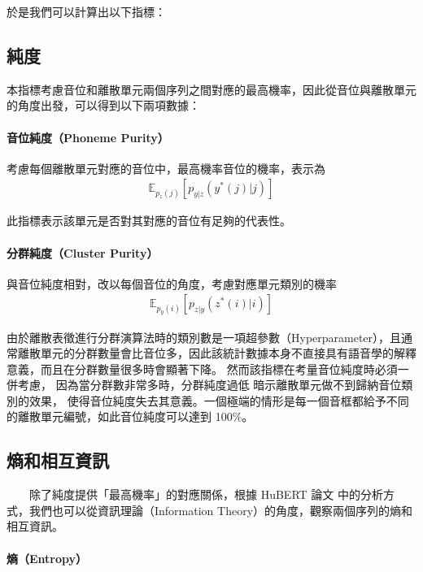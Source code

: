 於是我們可以計算出以下指標：

\subsection{純度}

        本指標考慮音位和離散單元兩個序列之間對應的最高機率，因此從音位與離散單元的角度出發，可以得到以下兩項數據：

\paragraph{音位純度（Phoneme Purity）}

        考慮每個離散單元對應的音位中，最高機率音位的機率，表示為
    \begin{align}
      \mathbb{E}_{p_z(j)}\left[p_{y|z}(y^*(j)|j) \right]
    \end{align}

此指標表示該單元是否對其對應的音位有足夠的代表性。

\paragraph{分群純度（Cluster Purity）}

        與音位純度相對，改以每個音位的角度，考慮對應單元類別的機率
    \begin{align}
      \mathbb{E}_{p_y(i)}\left[p_{z|y}(z^*(i)|i) \right]
    \end{align}

        由於離散表徵進行分群演算法時的類別數是一項超參數（Hyperparameter），且通常離散單元的分群數量會比音位多，因此該統計數據本身不直接具有語音學的解釋意義，而且在分群數量很多時會顯著下降。
然而該指標在考量音位純度時必須一併考慮，
因為當分群數非常多時，分群純度過低
暗示離散單元做不到歸納音位類別的效果，
使得音位純度失去其意義。一個極端的情形是每一個音框都給予不同的離散單元編號，如此音位純度可以達到
         100\%。

\subsection{熵和相互資訊}

　　除了純度提供「最高機率」的對應關係，根據 HuBERT 論文 \cite{hsu_hubert_2021-2} 中的分析方式，我們也可以從資訊理論（Information Theory）的角度，觀察兩個序列的熵和相互資訊。

\paragraph{熵（Entropy）}

